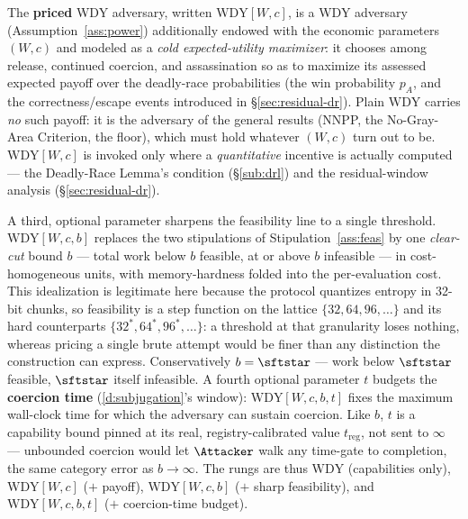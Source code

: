 \begin{definition}\label{def:priced}
The \textbf{priced} WDY adversary,
written $\mathrm{WDY}[W,c]$, is a WDY
adversary (Assumption~\ref{ass:power}) additionally endowed with the economic
parameters $(W,c)$ and modeled as a \emph{cold expected-utility maximizer}: it
chooses among release, continued coercion, and assassination so as to maximize
its assessed expected payoff over the deadly-race probabilities (the win
probability $p_A$, and the correctness/escape events introduced in
\S\ref{sec:residual-dr}). Plain $\mathrm{WDY}$
carries \emph{no} such payoff: it is the adversary of the general results (NNPP,
the No-Gray-Area Criterion, the floor), which must hold whatever
$(W,c)$ turn out to be. $\mathrm{WDY}[W,c]$ is invoked only where a
\emph{quantitative} incentive is actually computed --- the Deadly-Race Lemma's
condition (\S\ref{sub:drl}) and the residual-window analysis
(\S\ref{sec:residual-dr}).

A third, optional parameter sharpens the feasibility line to a single threshold.
$\mathrm{WDY}[W,c,b]$ replaces the two stipulations of Stipulation~\ref{ass:feas}
by one \emph{clear-cut} bound $b$ --- total work below $b$ feasible, at or above
$b$ infeasible --- in cost-homogeneous units, with memory-hardness folded into the
per-evaluation cost. This idealization is legitimate here because the protocol
quantizes entropy in 32-bit chunks, so feasibility is a step function on the
lattice $\{32, 64, 96, \dots\}$ and its hard counterparts
$\{32^{*}, 64^{*}, 96^{*}, \dots\}$: a threshold at that granularity loses
nothing, whereas pricing a single brute attempt would be finer than any
distinction the construction can express. Conservatively $b = \sftstar$ --- work
below $\sftstar$ feasible, $\sftstar$ itself infeasible. A fourth optional parameter $t$ budgets the \textbf{coercion
time} (\ref{d:subjugation}'s window): $\mathrm{WDY}[W,c,b,t]$ fixes the maximum wall-clock time for which the
adversary can sustain coercion. Like $b$, $t$ is a capability bound pinned at its
real, registry-calibrated value $t_{\mathrm{reg}}$, not sent to $\infty$ ---
unbounded coercion would let $\Attacker$ walk any time-gate to completion, the same
category error as $b\to\infty$. The rungs are thus $\mathrm{WDY}$ (capabilities
only), $\mathrm{WDY}[W,c]$ ($+$ payoff), $\mathrm{WDY}[W,c,b]$ ($+$ sharp
feasibility), and $\mathrm{WDY}[W,c,b,t]$ ($+$ coercion-time budget).
\end{definition}

